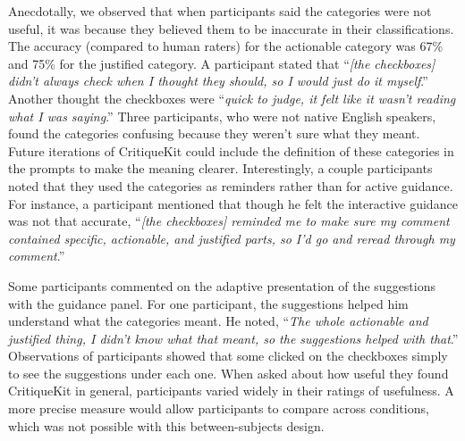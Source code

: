 Anecdotally, we observed that when participants said the categories were not useful, it was because they believed them to be inaccurate in their classifications. The accuracy (compared to human raters) for the actionable category was 67\% and 75\% for the justified category. A participant stated that ``\textit{[the checkboxes] didn't always check when I thought they should, so I would just do it myself}.'' Another thought the checkboxes were ``\textit{quick to judge, it felt like it wasn't reading what I was saying}.'' Three participants, who were not native English speakers, found the categories confusing because they weren't sure what they meant. Future iterations of CritiqueKit could include the definition of these categories in the prompts to make the meaning clearer. Interestingly, a couple participants noted that they used the categories as reminders rather than for active guidance. For instance, a participant mentioned that though he felt the interactive guidance was not that accurate, ``\textit{[the checkboxes] reminded me to make sure my comment contained specific, actionable, and justified parts, so I'd go and reread through my comment}.'' 

Some participants commented on the adaptive presentation of the suggestions with the guidance panel. For one participant, the suggestions helped him understand what the categories meant. He noted, ``\textit{The whole actionable and justified thing, I didn't know what that meant, so the suggestions helped with that}.'' Observations of participants showed that some clicked on the checkboxes simply to see the suggestions under each one. When asked about how useful they found CritiqueKit in general, participants varied widely in their ratings of usefulness. A more precise measure would allow participants to compare across conditions, which was not possible with this between-subjects design. 
